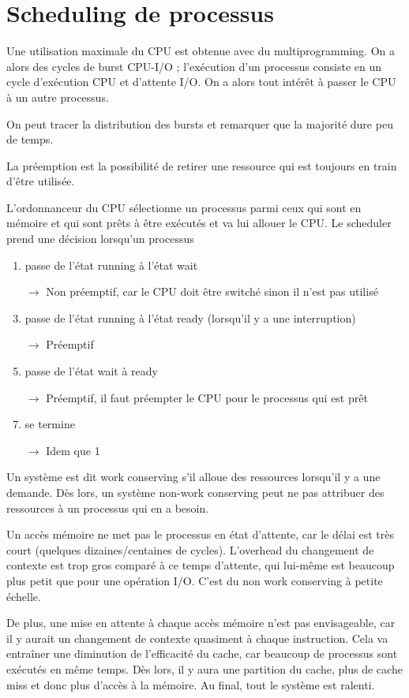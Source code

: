 \chapter{Scheduling de processus}

Une utilisation maximale du CPU est obtenue avec du multiprogramming. On a alors des cycles de burst CPU-I/O ; l'exécution d'un processus consiste en un cycle d'exécution CPU et d'attente I/O. On a alors tout intérêt à passer le CPU à un autre processus.

On peut tracer la distribution des bursts et remarquer que la majorité dure peu de temps.


La préemption est la possibilité de retirer une ressource qui est toujours en train d'être utilisée.

L'ordonnanceur du CPU sélectionne un processus parmi ceux qui sont en mémoire et qui sont prêts à être exécutés et va lui allouer le CPU. Le scheduler prend une décision lorsqu'un processus

\begin{enumerate}
	\item passe de l'état running à l'état wait
	\item[$\rightarrow$] Non préemptif, car le CPU doit être switché sinon il n'est pas utilisé
	\item passe de l'état running à l'état ready (lorsqu'il y a une interruption)
	\item[$\rightarrow$] Préemptif
	\item passe de l'état wait à ready
	\item[$\rightarrow$] Préemptif, il faut préempter le CPU pour le processus qui est prêt
	\item se termine
	\item[$\rightarrow$] Idem que 1
\end{enumerate}


Un système est dit work conserving s'il alloue des ressources lorsqu'il y a une demande. Dès lors, un système non-work conserving peut ne pas attribuer des ressources à un processus qui en a besoin.

Un accès mémoire ne met pas le processus en état d'attente, car le délai est très court (quelques dizaines/centaines de cycles). L'overhead du changement de contexte est trop gros comparé à ce temps d'attente, qui lui-même est beaucoup plus petit que pour une opération I/O. C'est du non work conserving à petite échelle.

De plus, une mise en attente à chaque accès mémoire n'est pas envisageable, car il y aurait un changement de contexte quasiment à chaque instruction. Cela va entraîner une diminution de l'efficacité du cache, car beaucoup de processus sont exécutés en même temps. Dès lors, il y aura une partition du cache, plus de cache miss et donc plus d'accès à la mémoire. Au final, tout le système est ralenti.

